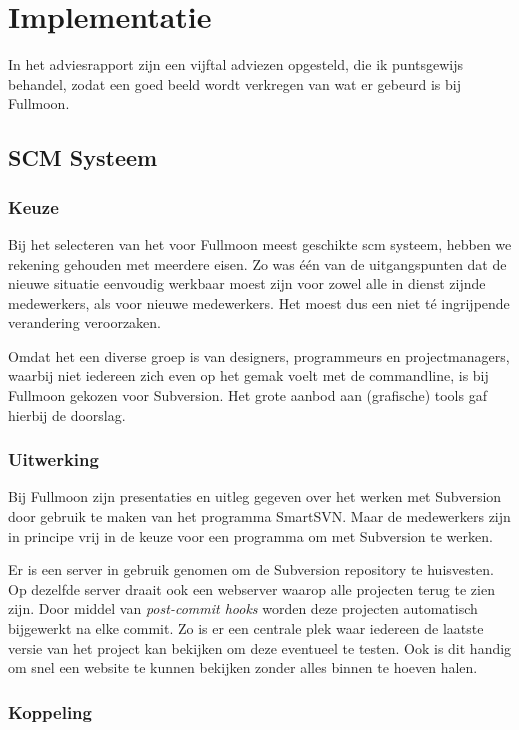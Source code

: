 \chapter{Implementatie}

In het adviesrapport zijn een vijftal adviezen opgesteld, die ik puntsgewijs behandel, zodat een goed beeld wordt verkregen van wat er gebeurd is bij Fullmoon.

\section{SCM Systeem}

\subsection{Keuze}

Bij het selecteren van het voor Fullmoon meest geschikte {\sc scm} systeem, hebben we rekening gehouden met meerdere eisen. Zo was één van de uitgangspunten dat de nieuwe situatie eenvoudig werkbaar moest zijn voor zowel alle in dienst zijnde medewerkers, als voor nieuwe medewerkers. Het moest dus een niet té ingrijpende verandering veroorzaken.

Omdat het een diverse groep is van designers, programmeurs en projectmanagers, waarbij niet iedereen zich even op het gemak voelt met de commandline, is bij Fullmoon gekozen voor Subversion. Het grote aanbod aan (grafische) tools gaf hierbij de doorslag.

\subsection{Uitwerking}

Bij Fullmoon zijn presentaties en uitleg gegeven over het werken met Subversion door gebruik te maken van het programma SmartSVN. Maar de medewerkers zijn in principe vrij in de keuze voor een programma om met Subversion te werken.

Er is een server in gebruik genomen om de Subversion repository te huisvesten. Op dezelfde server draait ook een webserver waarop alle projecten terug te zien zijn. Door middel van \emph{post-commit hooks} worden deze projecten automatisch bijgewerkt na elke commit. Zo is er een centrale plek waar iedereen de laatste versie van het project kan bekijken om deze eventueel te testen. Ook is dit handig om snel een website te kunnen bekijken zonder alles binnen te hoeven halen.

\subsection{Koppeling}


